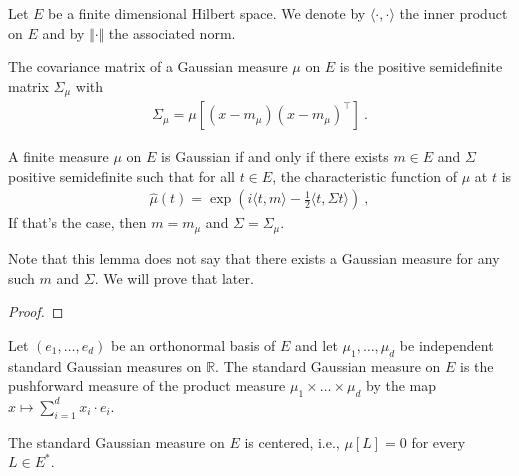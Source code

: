Let $E$ be a finite dimensional Hilbert space. We denote by $\langle \cdot, \cdot \rangle$ the inner product on $E$ and by $\Vert \cdot \Vert$ the associated norm.


\begin{definition}\label{def:covMatix}
The covariance matrix of a Gaussian measure $\mu$ on $E$ is the positive semidefinite matrix $\Sigma_\mu$ with
\begin{align*}
  \Sigma_\mu = \mu[(x - m_\mu) (x - m_\mu)^\top] \: .
\end{align*}
\end{definition}


\begin{lemma}\label{lem:isGaussian_iff_charFun_eq}
A finite measure $\mu$ on $E$ is Gaussian if and only if there exists $m \in E$ and $\Sigma$ positive semidefinite such that for all $t \in E$, the characteristic function of $\mu$ at $t$ is
\begin{align*}
  \hat{\mu}(t) = \exp\left(i \langle t, m \rangle - \frac{1}{2} \langle t, \Sigma t \rangle\right) \: ,
\end{align*}
If that's the case, then $m = m_\mu$ and $\Sigma = \Sigma_\mu$.
\end{lemma}

Note that this lemma does not say that there exists a Gaussian measure for any such $m$ and $\Sigma$.
We will prove that later.

\begin{proof}

\end{proof}


\begin{definition}\label{def:stdGaussian}
Let $(e_1, \ldots, e_d)$ be an orthonormal basis of $E$ and let $\mu_1, \ldots, \mu_d$ be independent standard Gaussian measures on $\mathbb{R}$.
The standard Gaussian measure on $E$ is the pushforward measure of the product measure $\mu_1 \times \ldots \times \mu_d$ by the map $x \mapsto \sum_{i=1}^d x_i \cdot e_i$.
\end{definition}


\begin{lemma}\label{lem:isCentered_stdGaussian}
The standard Gaussian measure on $E$ is centered, i.e., $\mu[L] = 0$ for every $L \in E^*$.
\end{lemma}

